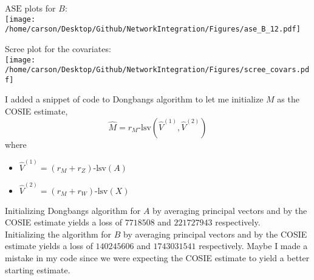 \documentclass[notheorems]{beamer}
\theoremstyle{definition}
\begin{document}
\begin{frame}
$\text{ASE}$ plots for $B$:\\
\texttt{[image: /home/carson/Desktop/Github/NetworkIntegration/Figures/ase\_B\_12.pdf]}
\end{frame}





















\begin{frame}
Scree plot for the covariates:\\
\texttt{[image: /home/carson/Desktop/Github/NetworkIntegration/Figures/scree\_covars.pdf]}
\end{frame}

















\begin{frame}
I added a snippet of code to Dongbangs algorithm to let me initialize $M$ as the COSIE estimate, $$\hat{M} = r_M \text{-lsv}(\hat{V}^{(1)}, \hat{V}^{(2)})$$ where 
\begin{itemize}
\item $\hat{V}^{(1)} = \text{$(r_M + r_Z)$-lsv}(A)$ 
\item $\hat{V}^{(2)} = \text{$(r_M + r_W)$-lsv}(X)$
\end{itemize}
\end{frame}

















\begin{frame}
Initializing Dongbangs algorithm for $A$ by averaging principal vectors and by the COSIE estimate yields a loss of  $7718508$ and $221727943$ respectively.\\

Initializing the algorithm for $B$ by averaging principal vectors and by the COSIE estimate yields a loss of  $140245606$ and $1743031541$ respectively. Maybe I made a mistake in my code since we were expecting the COSIE estimate to yield a better starting estimate. 
\end{frame}















%
\end{document}
